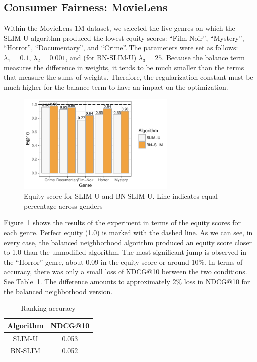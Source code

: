 \subsection{Consumer Fairness: MovieLens}

Within the MovieLens 1M dataset, we selected the five genres on which the SLIM-U algorithm produced the lowest equity scores: ``Film-Noir'', ``Mystery'', ``Horror'', ``Documentary'', and ``Crime''. The parameters were set as follows: $\lambda_1 = 0.1$, $\lambda_2 = 0.001$, and (for BN-SLIM-U) $\lambda_3 = 25$. Because the balance term measures the difference in weights, it tends to be much smaller than the terms that measure the sums of weights. Therefore, the regularization constant must be much higher for the balance term to have an impact on the optimization. 

\begin{figure}[tbh]
    \centering
    \includegraphics[width=3.00in]{imgs/bln/genre-compare3.pdf}
    \caption{Equity score for SLIM-U and BN-SLIM-U. Line indicates equal percentage across genders}
    \label{fig:genre}
\end{figure}

Figure~\ref{fig:genre} shows the results of the experiment in terms of the equity scores for each genre. Perfect equity (1.0) is marked with the dashed line. As we can see, in every case, the balanced neighborhood algorithm produced an equity score closer to 1.0 than the unmodified algorithm. The most significant jump is observed in the ``Horror'' genre, about 0.09 in the equity score or around 10\%. In terms of accuracy, there was only a small loss of NDCG@10 between the two conditions. See Table~\ref{tab:ndcg}. The difference amounts to approximately 2\% loss in NDCG@10 for the balanced neighborhood version.

\begin{table}
\centering
\begin{tabular}{c|c}
    Algorithm &  NDCG@10 \\ \hline
    SLIM-U & 0.053 \\ \hline
    BN-SLIM & 0.052 \\ \hline
\end{tabular}
\caption{Ranking accuracy}
\label{tab:ndcg}
\end{table}


